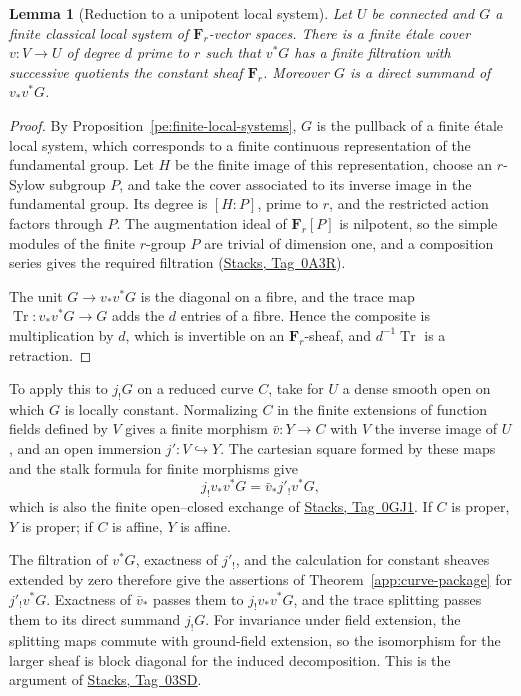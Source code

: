 \documentclass[11pt,a4paper]{article}
\numberwithin{equation}{section}
\newtheorem{lemma}[theorem]{Lemma}
\theoremstyle{definition}
\theoremstyle{remark}
\newcommand{\stacks}[1]{\href{https://stacks.math.columbia.edu/tag/#1}{\textnormal{Stacks, Tag~#1}}}
\begin{document}
\begin{lemma}[Reduction to a unipotent local system]
\label{app:curve-sylow-trace}
Let $U$ be connected and $G$ a finite classical local system of
$\mathbf F_r$-vector spaces.  There is a finite \'etale cover
$v\colon V\to U$ of degree $d$ prime to $r$ such that $v^*G$ has a
finite filtration with successive quotients the constant
sheaf $\mathbf F_r$.  Moreover $G$ is a direct summand of
$v_*v^*G$.
\end{lemma}
\begin{proof}
By Proposition~\ref{pe:finite-local-systems}, $G$ is the pullback of a
finite \'etale local system, which corresponds to a finite continuous
representation of the fundamental group.  Let $H$ be the finite image
of this representation, choose an $r$-Sylow subgroup $P$, and take the
cover associated to its inverse image in the fundamental group.  Its
degree is $[H:P]$, prime to $r$, and the restricted action factors
through $P$.  The augmentation ideal of $\mathbf F_r[P]$ is nilpotent,
so the simple modules of the finite $r$-group $P$ are trivial of
dimension one, and a composition series gives the required filtration
(\stacks{0A3R}).

The unit $G\to v_*v^*G$ is the diagonal on a fibre, and the trace map
$\operatorname{Tr}\colon v_*v^*G\to G$ adds the $d$ entries of a fibre.
Hence the composite is multiplication by $d$, which is invertible on an
$\mathbf F_r$-sheaf, and $d^{-1}\operatorname{Tr}$ is a retraction.
\end{proof}

To apply this to $j_!G$ on a reduced curve $C$, take for $U$ a dense
smooth open on which $G$ is locally constant.  Normalizing $C$ in the
finite extensions of function fields defined by $V$ gives a finite
morphism $\bar v\colon Y\to C$ with $V$ the inverse image of $U$, and an
open immersion $j'\colon V\hookrightarrow Y$.  The cartesian square
formed by these maps and the stalk formula for finite morphisms give
\[
 j_!v_*v^*G=\bar v_*j'_!v^*G,
\]
which is also the finite open--closed exchange of \stacks{0GJ1}.  If
$C$ is proper, $Y$ is proper; if $C$ is affine, $Y$ is affine.

The filtration of $v^*G$, exactness of $j'_!$, and the calculation for
constant sheaves extended by zero therefore give the assertions of
Theorem~\ref{app:curve-package} for $j'_!v^*G$.  Exactness of
$\bar v_*$ passes them to $j_!v_*v^*G$, and the trace splitting passes
them to its direct summand $j_!G$.  For invariance under field
extension, the splitting maps commute with ground-field extension, so
the isomorphism for the larger sheaf is block diagonal for the induced
decomposition.  This is the argument of \stacks{03SD}.
\end{document}
